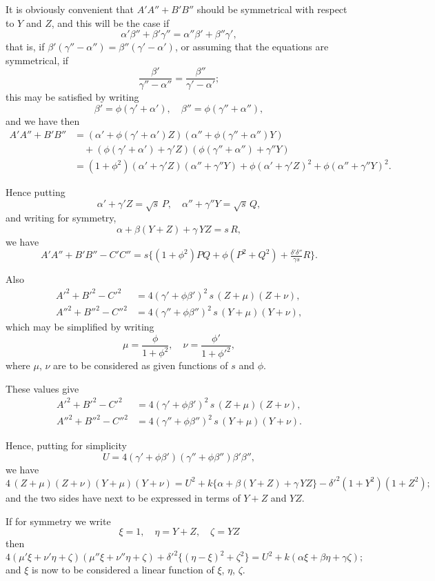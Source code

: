\documentclass[11pt]{article}
\begin{document}
It is obviously convenient that $A'A''+B'B''$ should be symmetrical with respect to $Y$ and $Z$, and this will be the case if
\[
\alpha'\beta''+\beta'\gamma'' = \alpha''\beta'+\beta''\gamma',
\]
that is, if $\beta'(\gamma''-\alpha'') = \beta''(\gamma'-\alpha')$, or assuming that the equations are symmetrical, if
\[
\frac{\beta'}{\gamma''-\alpha''} = \frac{\beta''}{\gamma'-\alpha'};
\]
this may be satisfied by writing
\[
\beta' = \phi(\gamma'+\alpha'), \quad \beta'' = \phi(\gamma''+\alpha''),
\]
and we have then
\begin{align*}
A'A''+B'B'' &= (\alpha'+\phi(\gamma'+\alpha')Z)(\alpha''+\phi(\gamma''+\alpha'')Y) \\
&\quad + (\phi(\gamma'+\alpha')+\gamma'Z)(\phi(\gamma''+\alpha'')+\gamma''Y) \\
&= (1+\phi^2)(\alpha'+\gamma'Z)(\alpha''+\gamma''Y) + \phi(\alpha'+\gamma'Z)^2 + \phi(\alpha''+\gamma''Y)^2.
\end{align*}

Hence putting
\[
\alpha'+\gamma'Z = \sqrt{s}\,P, \quad \alpha''+\gamma''Y = \sqrt{s}\,Q,
\]
and writing for symmetry,
\[
\alpha+\beta(Y+Z)+\gamma\,YZ = s\,R,
\]
we have
\[
A'A''+B'B''-C'C'' = s\{(1+\phi^2)PQ+\phi(P^2+Q^2)+\tfrac{\delta'\delta''}{\gamma s}R\}.
\]

Also
\begin{align*}
A'^2+B'^2-C'^2 &= 4(\gamma'+\phi\beta')^2\,s\,(Z+\mu)(Z+\nu),\\
A''^2+B''^2-C''^2 &= 4(\gamma''+\phi\beta'')^2\,s\,(Y+\mu)(Y+\nu),
\end{align*}
which may be simplified by writing
\[
\mu = \frac{\phi}{1+\phi^2}, \quad \nu = \frac{\phi'}{1+\phi'^2},
\]
where $\mu$, $\nu$ are to be considered as given functions of $s$ and $\phi$.

These values give
\begin{align*}
A'^2+B'^2-C'^2 &= 4(\gamma'+\phi\beta')^2\,s\,(Z+\mu)(Z+\nu),\\
A''^2+B''^2-C''^2 &= 4(\gamma''+\phi\beta'')^2\,s\,(Y+\mu)(Y+\nu).
\end{align*}

Hence, putting for simplicity
\[
U = 4(\gamma'+\phi\beta')(\gamma''+\phi\beta'')\beta'\beta'',
\]
we have
\[
4\,(Z+\mu)(Z+\nu)(Y+\mu)(Y+\nu) = U^2 + k\{\alpha+\beta(Y+Z)+\gamma\,YZ\} - \delta'^2(1+Y^2)(1+Z^2);
\]
and the two sides have next to be expressed in terms of $Y+Z$ and $YZ$.

If for symmetry we write
\[
\xi = 1, \quad \eta = Y+Z, \quad \zeta = YZ
\]
then
\[
4(\mu'\xi+\nu'\eta+\zeta)(\mu''\xi+\nu''\eta+\zeta) + \delta'^2\{(\eta-\xi)^2+\zeta^2\} = U^2 + k(\alpha\xi+\beta\eta+\gamma\zeta);
\]
and $\xi$ is now to be considered a linear function of $\xi$, $\eta$, $\zeta$.
\end{document}
